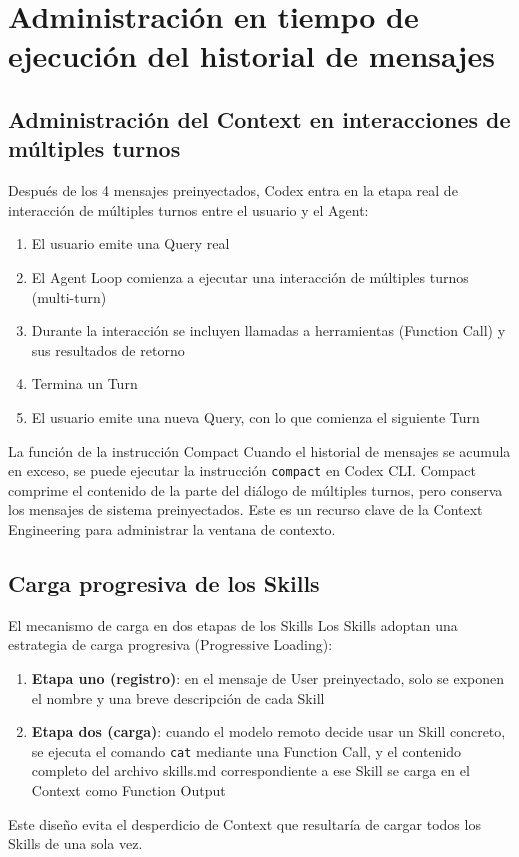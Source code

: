 \section{Administración en tiempo de ejecución del historial de mensajes}

\subsection{Administración del Context en interacciones de múltiples turnos}

Después de los 4 mensajes preinyectados, Codex entra en la etapa real de interacción de múltiples turnos entre el usuario y el Agent:

\begin{enumerate}
    \item El usuario emite una Query real
    \item El Agent Loop comienza a ejecutar una interacción de múltiples turnos (multi-turn)
    \item Durante la interacción se incluyen llamadas a herramientas (Function Call) y sus resultados de retorno
    \item Termina un Turn
    \item El usuario emite una nueva Query, con lo que comienza el siguiente Turn
\end{enumerate}

\begin{importantbox}{La función de la instrucción Compact}
Cuando el historial de mensajes se acumula en exceso, se puede ejecutar la instrucción \texttt{compact} en Codex CLI. Compact comprime el contenido de la parte del diálogo de múltiples turnos, pero conserva los mensajes de sistema preinyectados. Este es un recurso clave de la Context Engineering para administrar la ventana de contexto.
\end{importantbox}

\subsection{Carga progresiva de los Skills}

\begin{knowledgebox}{El mecanismo de carga en dos etapas de los Skills}
Los Skills adoptan una estrategia de carga progresiva (Progressive Loading):
\begin{enumerate}
    \item \textbf{Etapa uno (registro)}: en el mensaje de User preinyectado, solo se exponen el nombre y una breve descripción de cada Skill
    \item \textbf{Etapa dos (carga)}: cuando el modelo remoto decide usar un Skill concreto, se ejecuta el comando \texttt{cat} mediante una Function Call, y el contenido completo del archivo skills.md correspondiente a ese Skill se carga en el Context como Function Output
\end{enumerate}
Este diseño evita el desperdicio de Context que resultaría de cargar todos los Skills de una sola vez.
\end{knowledgebox}

